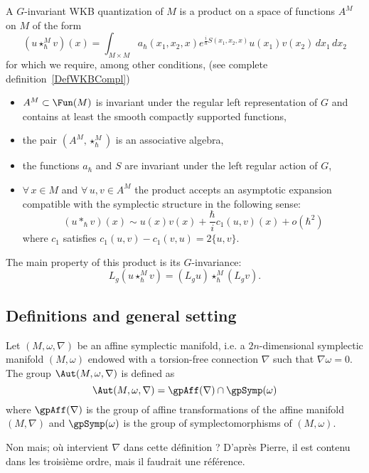 A $G$-invariant WKB quantization of $M$ is a product on a space of functions $A^{M}$ on $M$ of the form
\[
	(u\star^M_{\hbar}v)(x)=\int_{M\times M} a_{\hbar}(x_1,x_2,x) e^{\frac{ i }{ \hbar }S(x_1,x_2,x)} u(x_1)v(x_2)\,dx_1\,dx_2
\]
for which we require, among other conditions, (see complete definition~\ref{DefWKBCompl})
\begin{itemize}
	\item $A^M\subset \Fun(M)$ is invariant under the regular left representation of $G$ and contains at least the smooth compactly supported functions,
	\item the pair $(A^M,\star^M_{\hbar})$ is an associative algebra,
	\item the functions $a_{\hbar}$ and $S$ are invariant under the left regular action of $G$,
	\item $\forall\, x\in M$ and $\forall\,u,v\in A^M$ the product accepts an asymptotic expansion compatible with the symplectic structure in the following sense:
	      \[
		      (u\ast_{\hbar} v)(x)\sim u(x)v(x)+\frac{ \hbar }{ i }c_{1}(u,v)(x)+o(\hbar^{2})
	      \]
	      where $c_{1}$ satisfies $c_{1}(u,v)-c_{1}(v,u)=2\{ u,v \}$.
\end{itemize}
The main property of this product is its $G$-invariance:
\[
	L_g(u\star^M_{\hbar}v)=(L_gu)\star^M_{\hbar}(L_gv).
\]

\subsection{Definitions and general setting}

Let $(M,\omega,\nabla)$ be an affine symplectic manifold, i.e. a $2n$-dimensional symplectic manifold $(M,\omega)$ endowed with a torsion-free connection $\nabla$ such that $\nabla\omega=0$. The  group $\Aut(M,\omega,\nabla)$ is defined as
\[
	\Aut(M,\omega,\nabla)=\gpAff(\nabla)\cap\gpSymp(\omega)
\]
where $\gpAff(\nabla)$ is the group of affine transformations of the affine manifold $(M,\nabla)$ and $\gpSymp(\omega)$ is the group of symplectomorphisms of $(M,\omega)$.


\begin{probleme}
	Non mais; où intervient $\nabla$ dans cette définition ? D'après Pierre, il est contenu dans les troisième ordre, mais il faudrait une référence.
	\label{ProbNablades}
\end{probleme}

